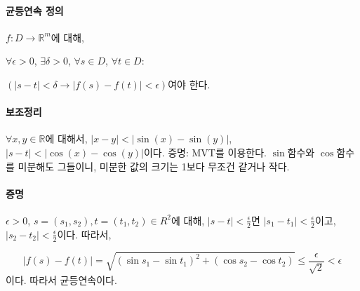 \paragraph{균등연속 정의}
$f: D \to \mathbb{R}^m$에 대해,

$\forall \epsilon > 0$, $\exists \delta >0$, $\forall s \in D$, $\forall t \in D$:

$\left(|s-t|< \delta \to |f(s)-f(t)| < \epsilon\right)$여야 한다.


\paragraph{보조정리}

$\forall x, y \in \mathbb{R}$에 대해서, 
$|x-y|<|\sin(x)-\sin(y)|$, $|s-t|<|\cos(x)-\cos(y)|$이다.
증명: MVT를 이용한다. $\sin$함수와 $\cos$함수를 미분해도 그들이니, 미분한 값의 크기는 1보다 무조건 같거나 작다.


\paragraph{증명}

$\epsilon > 0$, 
$s=(s_1, s_2),t=(t_1, t_2) \in R^2$에 대해, $|s-t|<\frac{\epsilon}{2}$면 $|s_1 - t_1|<\frac{\epsilon}{2}$이고, $|s_2 - t_2|<\frac{\epsilon}{2}$이다. 따라서,

$$|f(s)-f(t)| = \sqrt{\left(\sin s_1-\sin t_1\right)^2 + \left(\cos s_2-\cos t_2\right)} \le \frac{\epsilon}{\sqrt{2}} < \epsilon$$
이다. 따라서 균등연속이다.